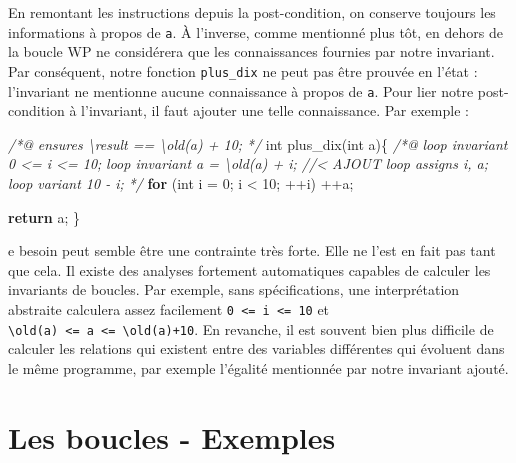 \documentclass[12pt,francais,]{scrbook}
\newenvironment{Shaded}{}{}
\newcommand{\KeywordTok}[1]{\textcolor[rgb]{0.00,0.44,0.13}{\textbf{{#1}}}}
\newcommand{\DataTypeTok}[1]{\textcolor[rgb]{0.56,0.13,0.00}{{#1}}}
\newcommand{\DecValTok}[1]{\textcolor[rgb]{0.25,0.63,0.44}{{#1}}}
\newcommand{\CommentTok}[1]{\textcolor[rgb]{0.38,0.63,0.69}{\textit{{#1}}}}
\newcommand{\NormalTok}[1]{{#1}}
\newenvironment{zdsblock}[1]{%
  \tcolorbox[beamer,%
    noparskip,breakable,
    colback=LightBlue,colframe=DarkBlue,%
    colbacklower=DarkBlue,%
    title=#1]
}{\endtcolorbox}
\begin{document}
En remontant les instructions depuis la post-condition, on conserve
toujours les informations à propos de \texttt{a}. À l'inverse, comme
mentionné plus tôt, en dehors de la boucle WP ne considérera que les
connaissances fournies par notre invariant. Par conséquent, notre
fonction \texttt{plus\_dix} ne peut pas être prouvée en l'état :
l'invariant ne mentionne aucune connaissance à propos de \texttt{a}.
Pour lier notre post-condition à l'invariant, il faut ajouter une telle
connaissance. Par exemple :

\begin{footnotesize}\begin{Shaded}
\begin{Highlighting}[]
\CommentTok{/*@}
\CommentTok{    ensures \textbackslash{}result == \textbackslash{}old(a) + 10;}
\CommentTok{*/}
\DataTypeTok{int} \NormalTok{plus_dix(}\DataTypeTok{int} \NormalTok{a)\{}
    \CommentTok{/*@}
\CommentTok{        loop invariant 0 <= i <= 10;}
\CommentTok{        loop invariant a = \textbackslash{}old(a) + i; //< AJOUT}
\CommentTok{        loop assigns i, a;}
\CommentTok{        loop variant 10 - i;}
\CommentTok{    */}
    \KeywordTok{for} \NormalTok{(}\DataTypeTok{int} \NormalTok{i = }\DecValTok{0}\NormalTok{; i < }\DecValTok{10}\NormalTok{; ++i)}
        \NormalTok{++a;}

    \KeywordTok{return} \NormalTok{a;}
\NormalTok{\}}
\end{Highlighting}
\end{Shaded}\end{footnotesize}

\begin{zdsblock}
  Ce besoin peut semble être une
  contrainte très forte. Elle ne l'est en fait pas tant que
  cela. Il existe des analyses fortement automatiques capables de
  calculer les invariants de boucles. Par exemple, sans
  spécifications, une interprétation abstraite calculera assez
  facilement \texttt{0\ \textless{}=\ i\ \textless{}=\ 10} et 
  \texttt{\textbackslash{}old(a)\ \textless{}=\ a\ \textless{}=\ \textbackslash{}old(a)+10}.
  En revanche, il est souvent bien plus difficile de calculer
  les relations qui existent entre des variables différentes qui
  évoluent dans le même programme, par exemple l'égalité
  mentionnée par notre invariant ajouté.
\end{zdsblock}

\section{Les boucles - Exemples}\label{les-boucles---exemples}
\end{document}

